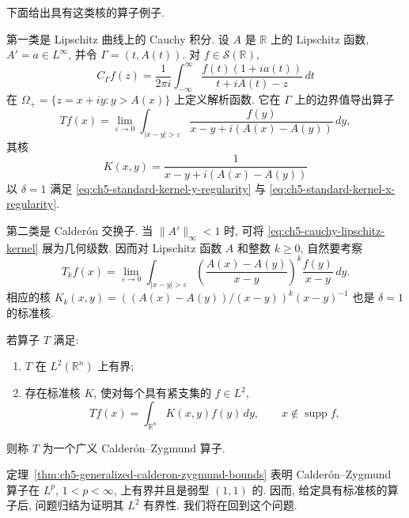 下面给出具有这类核的算子例子.

第一类是 Lipschitz 曲线上的 Cauchy 积分. 设 $A$ 是 $\mathbb R$ 上的 Lipschitz 函数, $A'=a\in L^\infty$, 并令 $\Gamma=(t,A(t))$. 对 $f\in\mathcal S(\mathbb R)$,
\[
 C_\Gamma f(z)=\frac1{2\pi i}\int_{-\infty}^\infty
 \frac{f(t)(1+ia(t))}{t+iA(t)-z}\,dt
\]
在 $\Omega_+=\{z=x+iy:y>A(x)\}$ 上定义解析函数. 它在 $\Gamma$ 上的边界值导出算子
\[
 Tf(x)=\lim_{\varepsilon\to0}\int_{|x-y|>\varepsilon}
 \frac{f(y)}{x-y+i(A(x)-A(y))}\,dy,
\]
其核
\begin{equation}
\label{eq:ch5-cauchy-lipschitz-kernel}
 K(x,y)=\frac1{x-y+i(A(x)-A(y))}
\end{equation}
以 $\delta=1$ 满足 \eqref{eq:ch5-standard-kernel-y-regularity} 与 \eqref{eq:ch5-standard-kernel-x-regularity}.

\hypertarget{chapter-05-page-112}{}
第二类是 Calderón 交换子. 当 $\|A'\|_\infty<1$ 时, 可将 \eqref{eq:ch5-cauchy-lipschitz-kernel} 展为几何级数. 因而对 Lipschitz 函数 $A$ 和整数 $k\ge0$, 自然要考察
\[
 T_kf(x)=\lim_{\varepsilon\to0}\int_{|x-y|>\varepsilon}
 \left(\frac{A(x)-A(y)}{x-y}\right)^k\frac{f(y)}{x-y}\,dy.
\]
相应的核 $K_k(x,y)=((A(x)-A(y))/(x-y))^k(x-y)^{-1}$ 也是 $\delta=1$ 的标准核.

\begin{Definition}
\label{def:ch5-calderon-zygmund-operator}
若算子 $T$ 满足:
\begin{enumerate}
\item $T$ 在 $L^2(\mathbb R^n)$ 上有界;
\item 存在标准核 $K$, 使对每个具有紧支集的 $f\in L^2$,
\[
 Tf(x)=\int_{\mathbb R^n}K(x,y)f(y)\,dy,
 \qquad x\notin\operatorname{supp}f,
\]
\end{enumerate}
则称 $T$ 为一个广义 Calderón--Zygmund 算子.
\end{Definition}

定理~\ref{thm:ch5-generalized-calderon-zygmund-bounds} 表明 Calderón--Zygmund 算子在 $L^p$, $1<p<\infty$, 上有界并且是弱型 $(1,1)$ 的. 因而, 给定具有标准核的算子后, 问题归结为证明其 $L^2$ 有界性. 我们将在回到这个问题.
